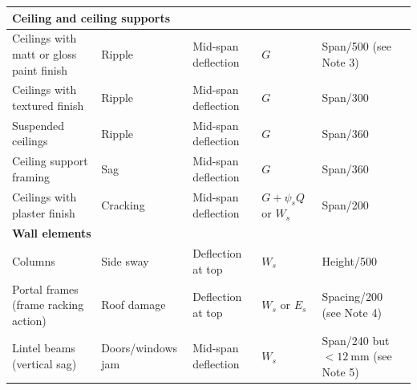 \begin{table}
\begin{tabular}{lllll}
	\multicolumn{5}{l}{\textbf{Ceiling and ceiling supports}}                                                                                                                                                                  \\ \midrule
	Ceilings with matt or gloss paint finish                         & Ripple                                & Mid-span deflection               & $G$                         & Span/500 (see Note 3)                        \\
	Ceilings with textured finish                                    & Ripple                                & Mid-span deflection               & $G$                         & Span/300                                      \\
	Suspended ceilings                                               & Ripple                                & Mid-span deflection               & $G$                         & Span/360                                      \\
	Ceiling support framing                                          & Sag                                   & Mid-span deflection               & $G$                         & Span/360                                      \\
	Ceilings with plaster finish                                     & Cracking                              & Mid-span deflection               & $G+\psi_sQ$ or $W_s$        & Span/200                                      \\ \midrule
	\multicolumn{5}{l}{\textbf{Wall elements}}                                                                                                                                                                                 \\ \midrule
	Columns                                                          & Side sway                             & Deflection at top                 & $W_s$                       & Height/500                                    \\
	Portal frames (frame racking action)                             & Roof damage                           & Deflection at top                 & $W_s$ or $E_s$              & Spacing/200 (see Note 4)                      \\
	Lintel beams (vertical sag)                                      & Doors/windows jam                     & Mid-span deflection               & $W_s$                       & Span/240 but $<\SI{12}{\mm}$ (see Note 5)     \\

\end{tabular}
\end{table}
